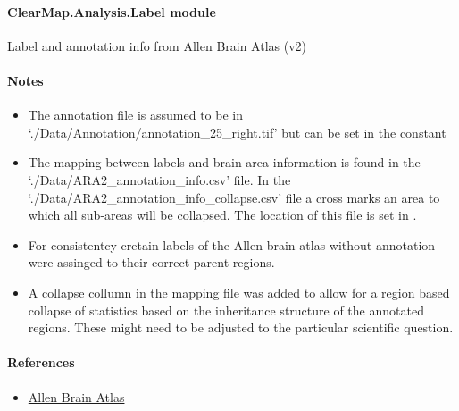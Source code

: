 \documentclass[letterpaper,10pt,english]{sphinxmanual}
\begin{document}
\paragraph{ClearMap.Analysis.Label module}
\label{api/ClearMap.Analysis:module-ClearMap.Analysis.Label}\label{api/ClearMap.Analysis:clearmap-analysis-label-module}
Label and annotation info from Allen Brain Atlas (v2)
\paragraph{Notes}
\begin{itemize}
\item {} 
The annotation file is assumed to be in `./Data/Annotation/annotation\_25\_right.tif'
but can be set in the constant {\hyperref[api/ClearMap.Analysis:ClearMap.Analysis.Label.DefaultLabeledImageFile]{\emph{}}}

\item {} 
The mapping between labels and brain area information is found in the
`./Data/ARA2\_annotation\_info.csv' file.
In the `./Data/ARA2\_annotation\_info\_collapse.csv' file a cross marks an area
to which all sub-areas will be collapsed.
The location of this file is set in {\hyperref[api/ClearMap.Analysis:ClearMap.Analysis.Label.DefaultAnnotationFile]{\emph{}}}.

\item {} 
For consistentcy cretain labels of the Allen brain atlas without
annotation were assinged to their correct parent regions.

\item {} 
A collapse collumn in the mapping file was added to allow for a region
based collapse of statistics based on the inheritance structure of the
annotated regions. These might need to be adjusted to the particular
scientific question.

\end{itemize}
\paragraph{References}
\begin{itemize}
\item {} 
\href{http://mouse.brain-map.org/static/atlas}{Allen Brain Atlas}

\end{itemize}
\end{document}
